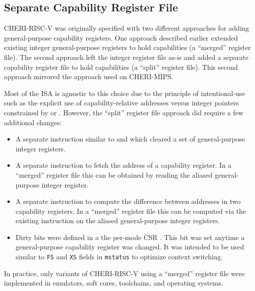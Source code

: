 \subsection{Separate Capability Register File}

CHERI-RISC-V was originally specified with two different approaches
for adding general-purpose capability registers.  One approach
described earlier extended existing integer general-purpose registers
to hold capabilities (a ``merged'' register file).  The second
approach left the integer register file as-is and added a separate
capability register file to hold capabilities (a ``split'' register
file).  This second approach mirrored the approach used on CHERI-MIPS.

Most of the ISA is agnostic to this choice due to the principle of
intentional-use such as the explicit use of capability-relative
addresses versus integer pointers constrained by \DDC{} or \PCC{}.
However, the ``split'' register file approach did require a few
additional changes:

\begin{itemize}
\item A separate  instruction similar to
   and  which cleared a set
  of general-purpose integer registers.

\item A separate  instruction to fetch the address
  of a capability register.  In a ``merged'' register file this can be
  obtained by reading the aliased general-purpose integer register.

\item A separate  instruction to compute the difference
  between addresses in two capability registers.  In a ``merged''
  register file this can be computed via the existing 
  instruction on the aliased general-purpose integer registers.

\item Dirty bits were defined in a the per-mode CSR \xccsr{}. This bit
  was set anytime a general-purpose capability register was changed.
  It was intended to be used similar to \texttt{FS} and \texttt{XS}
  fields in \texttt{mstatus} to optimize context switching.
\end{itemize}

In practice, only variants of CHERI-RISC-V using a ``merged'' register
file were implemented in emulators, soft cores, toolchains, and
operating systems.

